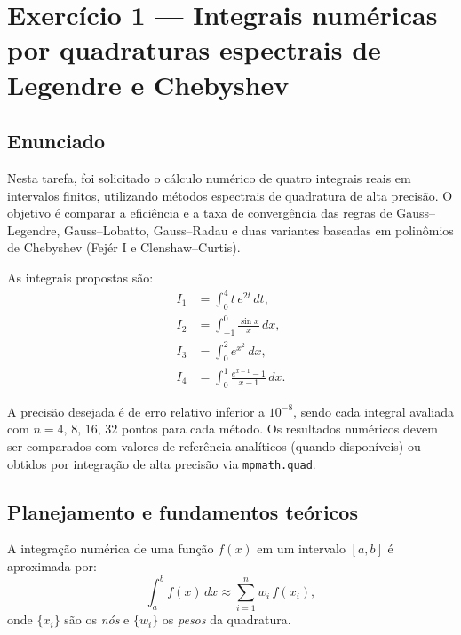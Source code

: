 \documentclass[12pt,a4paper]{article}
\begin{document}


\section{Exercício 1 — Integrais numéricas por quadraturas espectrais de Legendre e Chebyshev}

\subsection{Enunciado}
Nesta tarefa, foi solicitado o cálculo numérico de quatro integrais reais em intervalos finitos, utilizando métodos espectrais de quadratura de alta precisão.  
O objetivo é comparar a eficiência e a taxa de convergência das regras de Gauss–Legendre, Gauss–Lobatto, Gauss–Radau e duas variantes baseadas em polinômios de Chebyshev (Fejér I e Clenshaw–Curtis).

As integrais propostas são:
\[
\begin{aligned}
I_1 &= \int_{0}^{4} t\,e^{2t}\,dt,\\[4pt]
I_2 &= \int_{-1}^{0} \frac{\sin x}{x}\,dx,\\[4pt]
I_3 &= \int_{0}^{2} e^{x^{2}}\,dx,\\[4pt]
I_4 &= \int_{0}^{1} \frac{e^{x-1}-1}{x-1}\,dx.
\end{aligned}
\]

A precisão desejada é de erro relativo inferior a $10^{-8}$, sendo cada integral avaliada com $n = 4,\,8,\,16,\,32$ pontos para cada método.  
Os resultados numéricos devem ser comparados com valores de referência analíticos (quando disponíveis) ou obtidos por integração de alta precisão via \texttt{mpmath.quad}.

\subsection{Planejamento e fundamentos teóricos}
A integração numérica de uma função $f(x)$ em um intervalo $[a,b]$ é aproximada por:
\[
\int_a^b f(x)\,dx \approx \sum_{i=1}^{n} w_i\,f(x_i),
\]
onde $\{x_i\}$ são os \emph{nós} e $\{w_i\}$ os \emph{pesos} da quadratura.
\end{document}
